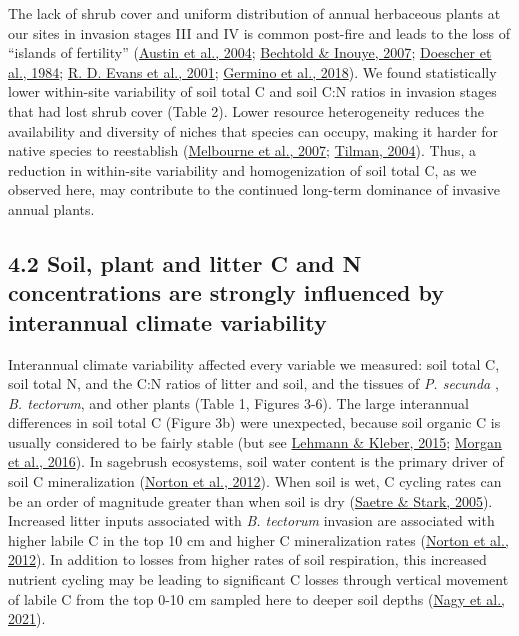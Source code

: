 \documentclass[
  11pt,
  a4paper,
]{article}
\begin{document}
The lack of shrub cover and uniform distribution of annual herbaceous plants at our sites in invasion stages III and IV is common post-fire and leads to the loss of ``islands of fertility'' (\protect\hyperlink{ref-Austin2004}{Austin et al., 2004}; \protect\hyperlink{ref-Bechtold2007}{Bechtold \& Inouye, 2007}; \protect\hyperlink{ref-Doescher1984}{Doescher et al., 1984}; \protect\hyperlink{ref-Evans2001}{R. D. Evans et al., 2001}; \protect\hyperlink{ref-Germino2018}{Germino et al., 2018}). We found statistically lower within-site variability of soil total C and soil C:N ratios in invasion stages that had lost shrub cover (Table 2). Lower resource heterogeneity reduces the availability and diversity of niches that species can occupy, making it harder for native species to reestablish (\protect\hyperlink{ref-Melbourne2007}{Melbourne et al., 2007}; \protect\hyperlink{ref-Tilman2004}{Tilman, 2004}). Thus, a reduction in within-site variability and homogenization of soil total C, as we observed here, may contribute to the continued long-term dominance of invasive annual plants.

\hypertarget{soil-plant-and-litter-c-and-n-concentrations-are-strongly-influenced-by-interannual-climate-variability}{%
\subsection{4.2 Soil, plant and litter C and N concentrations are strongly influenced by interannual climate variability}\label{soil-plant-and-litter-c-and-n-concentrations-are-strongly-influenced-by-interannual-climate-variability}}

Interannual climate variability affected every variable we measured: soil total C, soil total N, and the C:N ratios of litter and soil, and the tissues of \emph{P. secunda} , \emph{B. tectorum}, and other plants (Table 1, Figures 3-6). The large interannual differences in soil total C (Figure 3b) were unexpected, because soil organic C is usually considered to be fairly stable (but see \protect\hyperlink{ref-Lehmann2015}{Lehmann \& Kleber, 2015}; \protect\hyperlink{ref-Morgan2016}{Morgan et al., 2016}). In sagebrush ecosystems, soil water content is the primary driver of soil C mineralization (\protect\hyperlink{ref-Norton2012}{Norton et al., 2012}). When soil is wet, C cycling rates can be an order of magnitude greater than when soil is dry (\protect\hyperlink{ref-Saetre2005}{Saetre \& Stark, 2005}). Increased litter inputs associated with \emph{B. tectorum} invasion are associated with higher labile C in the top 10 cm and higher C mineralization rates (\protect\hyperlink{ref-Norton2012}{Norton et al., 2012}). In addition to losses from higher rates of soil respiration, this increased nutrient cycling may be leading to significant C losses through vertical movement of labile C from the top 0-10 cm sampled here to deeper soil depths (\protect\hyperlink{ref-Nagy2021}{Nagy et al., 2021}).
\end{document}
